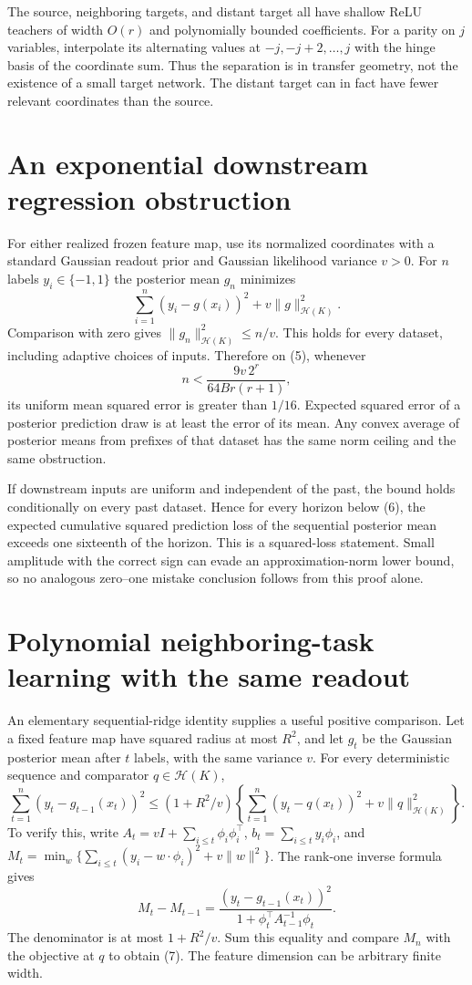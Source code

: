 \documentclass[11pt]{article}
\begin{document}
The source, neighboring targets, and distant target all have shallow
ReLU teachers of width $O(r)$ and polynomially bounded coefficients.
For a parity on $j$ variables, interpolate its alternating values at
$-j,-j+2,\ldots,j$ with the hinge basis of the coordinate sum.
Thus the separation is in transfer geometry, not the existence of a
small target network. The distant target can in fact have fewer
relevant coordinates than the source.

\section{An exponential downstream regression obstruction}
For either realized frozen feature map, use its normalized coordinates
with a standard Gaussian readout prior and Gaussian likelihood variance
$v>0$. For $n$ labels $y_i\in\{-1,1\}$ the posterior mean $g_n$
minimizes
\[
 \sum_{i=1}^n(y_i-g(x_i))^2+v\|g\|_{\mathcal H(K)}^2.
\]
Comparison with zero gives $\|g_n\|_{\mathcal H(K)}^2\le n/v$.
This holds for every dataset, including adaptive choices of inputs.
Therefore on (5), whenever
\[
                 n<\frac{9v\,2^r}{64Br(r+1)},           \tag{6}
\]
its uniform mean squared error is greater than $1/16$.
Expected squared error of a posterior prediction draw is at least the
error of its mean. Any convex average of posterior means from prefixes
of that dataset has the same norm ceiling and the same obstruction.

If downstream inputs are uniform and independent of the past, the
bound holds conditionally on every past dataset. Hence for every horizon
below (6), the expected cumulative squared prediction loss of the
sequential posterior mean exceeds one sixteenth of the horizon.
This is a squared-loss statement. Small amplitude with the correct
sign can evade an approximation-norm lower bound, so no analogous
zero--one mistake conclusion follows from this proof alone.

\section{Polynomial neighboring-task learning with the same readout}
An elementary sequential-ridge identity supplies a useful positive
comparison. Let a fixed feature map have squared radius at most $R^2$,
and let $g_t$ be the Gaussian posterior mean after $t$ labels, with the
same variance $v$. For every deterministic sequence and comparator
$q\in\mathcal H(K)$,
\[
 \sum_{t=1}^n(y_t-g_{t-1}(x_t))^2
 \le(1+R^2/v)\left\{\sum_{t=1}^n(y_t-q(x_t))^2
                                      +v\|q\|_{\mathcal H(K)}^2\right\}.
 \tag{7}
\]
To verify this, write $A_t=vI+\sum_{i\le t}\phi_i\phi_i^\top$,
$b_t=\sum_{i\le t}y_i\phi_i$, and
$M_t=\min_w\{\sum_{i\le t}(y_i-w\cdot\phi_i)^2+v\|w\|^2\}$.
The rank-one inverse formula gives
\[
 M_t-M_{t-1}
 =\frac{(y_t-g_{t-1}(x_t))^2}
        {1+\phi_t^\top A_{t-1}^{-1}\phi_t}.
\]
The denominator is at most $1+R^2/v$. Sum this equality and compare
$M_n$ with the objective at $q$ to obtain (7).
The feature dimension can be arbitrary finite width.
\end{document}
